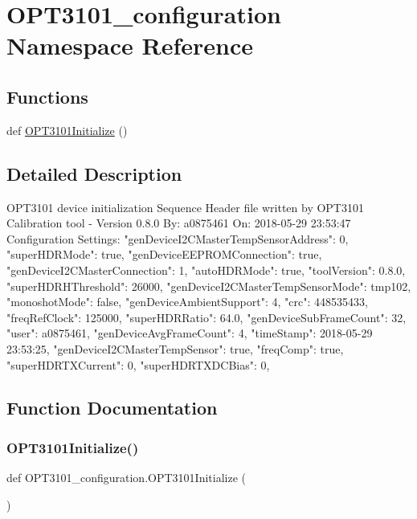 \hypertarget{namespace_o_p_t3101__configuration}{}\section{O\+P\+T3101\+\_\+configuration Namespace Reference}
\label{namespace_o_p_t3101__configuration}
\subsection*{Functions}
\begin{DoxyCompactItemize}
\item 
def \mbox{\hyperlink{namespace_o_p_t3101__configuration_a940a8e943485069c77fbe1a6c80a4222}{O\+P\+T3101\+Initialize}} ()
\end{DoxyCompactItemize}


\subsection{Detailed Description}
\begin{DoxyVerb}OPT3101 device initialization Sequence Header file written by OPT3101 Calibration tool - Version 0.8.0
By: a0875461
On: 2018-05-29 23:53:47
Configuration Settings:
{
    "genDeviceI2CMasterTempSensorAddress": 0,
    "superHDRMode": true,
    "genDeviceEEPROMConnection": true,
    "genDeviceI2CMasterConnection": 1,
    "autoHDRMode": true,
    "toolVersion": 0.8.0,
    "superHDRHThreshold": 26000,
    "genDeviceI2CMasterTempSensorMode": tmp102,
    "monoshotMode": false,
    "genDeviceAmbientSupport": 4,
    "crc": 448535433,
    "freqRefClock": 125000,
    "superHDRRatio": 64.0,
    "genDeviceSubFrameCount": 32,
    "user": a0875461,
    "genDeviceAvgFrameCount": 4,
    "timeStamp": 2018-05-29 23:53:25,
    "genDeviceI2CMasterTempSensor": true,
    "freqComp": true,
    "superHDRTXCurrent": 0,
    "superHDRTXDCBias": 0,
}
\end{DoxyVerb}
 

\subsection{Function Documentation}
\mbox{\label{namespace_o_p_t3101__configuration_a940a8e943485069c77fbe1a6c80a4222}} 
\subsubsection{\texorpdfstring{O\+P\+T3101\+Initialize()}{OPT3101Initialize()}}
{\footnotesize\ttfamily def O\+P\+T3101\+\_\+configuration.\+O\+P\+T3101\+Initialize (\begin{DoxyParamCaption}{ }\end{DoxyParamCaption})}

